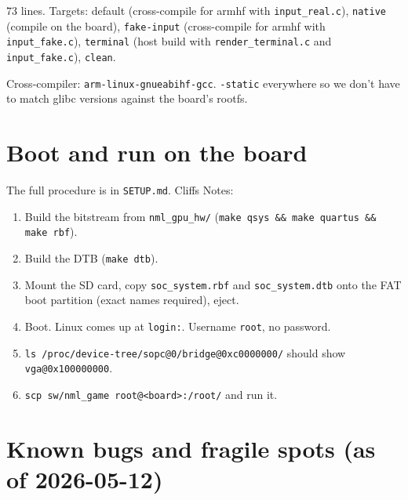 \documentclass[11pt,letterpaper]{article}
\begin{document}
73 lines. Targets: default (cross-compile for armhf with
\texttt{input\_real.c}), \texttt{native} (compile on the board),
\texttt{fake-input} (cross-compile for armhf with \texttt{input\_fake.c}),
\texttt{terminal} (host build with \texttt{render\_terminal.c} and
\texttt{input\_fake.c}), \texttt{clean}.

Cross-compiler: \texttt{arm-linux-gnueabihf-gcc}. \texttt{-static}
everywhere so we don't have to match glibc versions against the board's
rootfs.

\section{Boot and run on the board}

The full procedure is in \texttt{SETUP.md}. Cliffs Notes:

\begin{enumerate}[leftmargin=*,nosep]
  \item Build the bitstream from \texttt{nml\_gpu\_hw/}
    (\texttt{make qsys \&\& make quartus \&\& make rbf}).
  \item Build the DTB (\texttt{make dtb}).
  \item Mount the SD card, copy \texttt{soc\_system.rbf} and
    \texttt{soc\_system.dtb} onto the FAT boot partition (exact names
    required), eject.
  \item Boot. Linux comes up at \texttt{login:}. Username \texttt{root}, no
    password.
  \item \texttt{ls /proc/device-tree/sopc@0/bridge@0xc0000000/} should show
    \texttt{vga@0x100000000}.
  \item \texttt{scp sw/nml\_game root@<board>:/root/} and run it.
\end{enumerate}

\section{Known bugs and fragile spots (as of 2026-05-12)}
\end{document}
